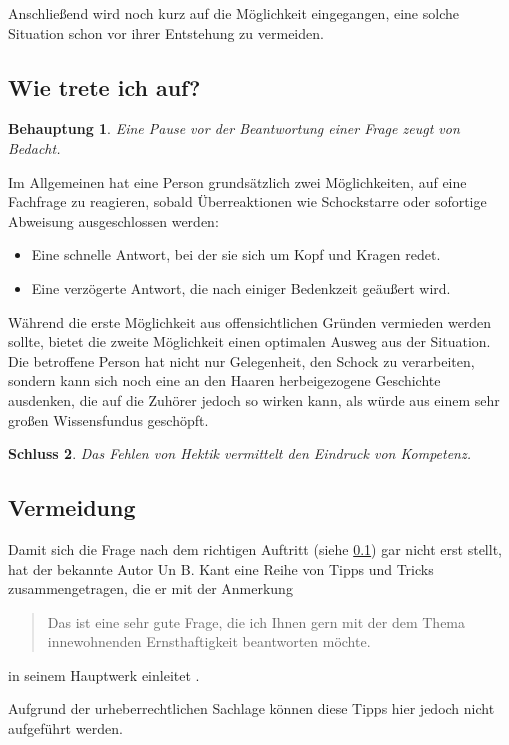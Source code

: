 \documentclass{article}
\newtheorem{beh}{Behauptung}[subsection]
\newtheorem{sch}[beh]{Schluss}
\begin{document}
  Anschließend wird noch kurz auf die Möglichkeit eingegangen, eine solche
  Situation schon vor ihrer Entstehung zu vermeiden.

  \subsection{Wie trete ich auf?}\label{auftritt_wie}
    \begin{beh}\label{ZeitSchinden}
      Eine Pause vor der Beantwortung einer Frage zeugt von Bedacht.
    \end{beh}
    Im Allgemeinen hat eine Person grundsätzlich zwei Möglichkeiten, auf eine
    Fachfrage zu reagieren, sobald Überreaktionen wie Schockstarre oder
    sofortige Abweisung ausgeschlossen werden:
    \begin{itemize}
      \item Eine schnelle Antwort, bei der sie sich um Kopf und Kragen redet.
      \item Eine verzögerte Antwort, die nach einiger Bedenkzeit geäußert wird.
    \end{itemize}
    Während die erste Möglichkeit aus offensichtlichen Gründen vermieden
    werden sollte, bietet die zweite Möglichkeit einen optimalen Ausweg aus
    der Situation. Die betroffene Person hat nicht nur Gelegenheit, den Schock
    zu verarbeiten, sondern kann sich noch eine an den Haaren herbeigezogene
    Geschichte ausdenken, die auf die Zuhörer jedoch so wirken kann, als würde
    aus einem sehr großen Wissensfundus geschöpft.
    \begin{sch}
      Das Fehlen von Hektik vermittelt den Eindruck von Kompetenz.
    \end{sch}

  \subsection{Vermeidung}\label{auftritt_vermeidung}
    Damit sich die Frage nach dem richtigen Auftritt (siehe \ref{auftritt_wie})
    gar nicht erst stellt, hat der bekannte Autor Un B. Kant eine Reihe von
    Tipps und Tricks zusammengetragen, die er mit der Anmerkung
    \begin{quote}
      Das ist eine sehr gute Frage, die ich Ihnen gern mit der dem Thema
      innewohnenden Ernsthaftigkeit beantworten möchte.
    \end{quote}
    in seinem Hauptwerk einleitet \cite[Seite XII]{ubk-ekg}.

    Aufgrund der urheberrechtlichen Sachlage können diese Tipps hier jedoch
    nicht aufgeführt werden.
\end{document}
